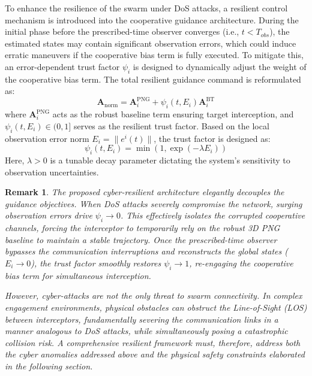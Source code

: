 \documentclass[lettersize,journal]{IEEEtran}
\newtheorem{remark}{Remark}
\begin{document}
To enhance the resilience of the swarm under DoS attacks, a resilient control mechanism is introduced into the cooperative guidance architecture. During the initial phase before the prescribed-time observer converges (i.e., $t < T_{obs}$), the estimated states may contain significant observation errors, which could induce erratic maneuvers if the cooperative bias term is fully executed. To mitigate this, an error-dependent trust factor $\psi_i$ is designed to dynamically adjust the weight of the cooperative bias term. The total resilient guidance command is reformulated as:
\begin{equation}
	\label{eq:resilient_guidance}
	\boldsymbol{A}_{\mathrm{norm} }= \mathbf{A}_i^{\mathrm{PNG}} + \psi_i(t, E_i) \boldsymbol{A}_i^{\mathrm{BT}}
\end{equation}
where $\mathbf{A}_i^{\mathrm{PNG}}$ acts as the robust baseline term ensuring target interception, and $\psi_i(t, E_i) \in (0, 1]$ serves as the resilient trust factor. Based on the local observation error norm $E_i = \|e^i(t)\|$, the trust factor is designed as:
\begin{equation}
	\label{eq:trust_factor}
	\psi_i(t, E_i) = \min \left( 1, \exp(-\lambda E_i) \right)
\end{equation}
Here, $\lambda > 0$ is a tunable decay parameter dictating the system's sensitivity to observation uncertainties.

\vspace{1mm}
\begin{remark}
	The proposed cyber-resilient architecture elegantly decouples the guidance objectives. When DoS attacks severely compromise the network, surging observation errors drive $\psi_i \to 0$. This effectively isolates the corrupted cooperative channels, forcing the interceptor to temporarily rely on the robust 3D PNG baseline to maintain a stable trajectory. Once the prescribed-time observer bypasses the communication interruptions and reconstructs the global states ($E_i \to 0$), the trust factor smoothly restores $\psi_i \to 1$, re-engaging the cooperative bias term for simultaneous interception. 
	
	However, cyber-attacks are not the only threat to swarm connectivity. In complex engagement environments, physical obstacles can obstruct the Line-of-Sight (LOS) between interceptors, fundamentally severing the communication links in a manner analogous to DoS attacks, while simultaneously posing a catastrophic collision risk. A comprehensive resilient framework must, therefore, address both the cyber anomalies addressed above and the physical safety constraints elaborated in the following section.
\end{remark}
\vspace{1mm}
\end{document}
